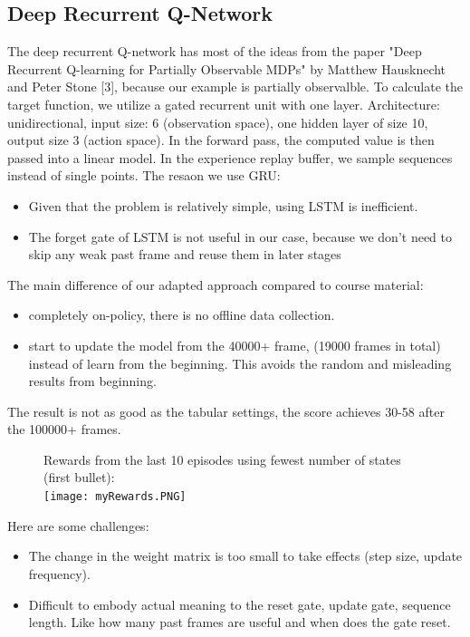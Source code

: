 \documentclass[twoside,11pt]{article}
\begin{document}
\subsection{Deep Recurrent Q-Network}
The deep recurrent Q-network has most of the ideas from the paper "Deep Recurrent Q-learning for Partially Observable MDPs" by Matthew Hausknecht and Peter Stone [3], because our example is partially observalble. To calculate the target function, we utilize a gated recurrent unit with one layer. \newline Architecture: unidirectional, input size: 6 (observation space), one hidden layer of size 10, output size 3 (action space). In the forward pass, the computed value is then passed into a linear model. In the experience replay buffer, we sample sequences instead of single points.
\newline
The resaon we use GRU: \newline
\begin{itemize}
\item Given that the problem is relatively simple, using LSTM is inefficient.
\item The forget gate of LSTM is not useful in our case, because we don't need to skip any weak past frame and reuse them in later stages
\end{itemize}
The main difference of our adapted approach compared to course material: \newline
\begin{itemize}
\item completely on-policy, there is no offline data collection.
\item start to update the model from the 40000+ frame, (19000 frames in total) instead of learn from the beginning. This avoids the random and misleading results from beginning.
\end{itemize}
The result is not as good as the tabular settings, the score achieves 30-58 after the 100000+ frames. \newline
\begin{figure}[H]
Rewards from the last 10 episodes using fewest number of states (first bullet):\\
\texttt{[image: myRewards.PNG]}
\centering
\end{figure}

Here are some challenges: \newline
\begin{itemize}
\item The change in the weight matrix is too small to take effects (step size, update frequency).
\item Difficult to embody actual meaning to the reset gate, update gate, sequence length. Like how many past frames are useful and when does the gate reset.
\end{itemize}
\end{document}
